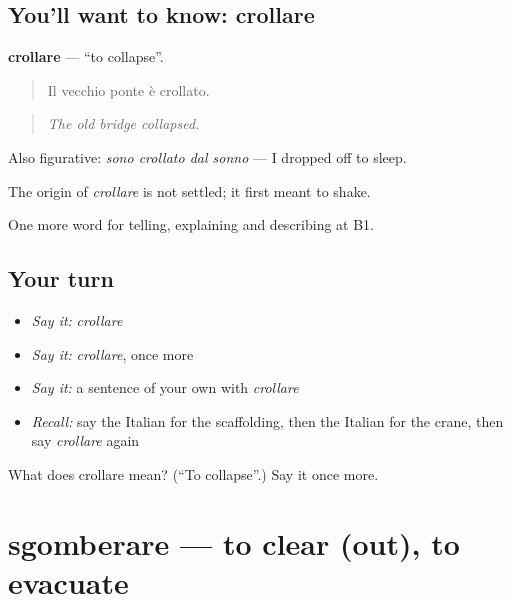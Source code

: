 \subsection*{You'll want to know: crollare}
\textbf{crollare} — \textquotedblleft{}to collapse\textquotedblright{}.

\begin{quote}
Il vecchio ponte è crollato.
\end{quote}

\begin{quote}
\emph{The old bridge collapsed.}
\end{quote}

Also figurative: \emph{sono crollato dal sonno} — I dropped off to sleep.

\begin{cousinweb}
The origin of \emph{crollare} is not settled; it first meant to shake.
\end{cousinweb}

\begin{grammarlens}[title={What you've built}]
One more word for telling, explaining and describing at B1.
\end{grammarlens}

\subsection*{Your turn}
\begin{itemize}
\raggedright
  \item \emph{Say it:} \emph{crollare}
  \item \emph{Say it:} \emph{crollare}, once more
  \item \emph{Say it:} a sentence of your own with \emph{crollare}
  \item \emph{Recall:} say the Italian for the scaffolding, then the Italian for the crane, then say \emph{crollare} again
\end{itemize}

\begin{tcolorbox}[breakable,colback=teal!4,colframe=teal!35!black,title={Before you move on}]
What does crollare mean? (\textquotedblleft{}To collapse\textquotedblright{}.) Say it once more.
\end{tcolorbox}
\section[sgomberare]{sgomberare — to clear (out), to evacuate}

\label{lesson:IT-C449-sgomberare}



